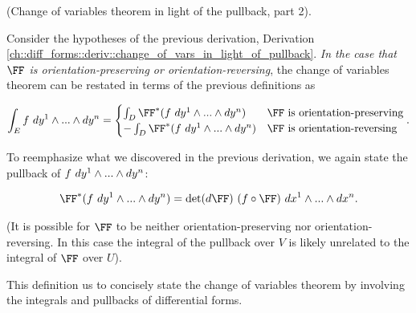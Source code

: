 \begin{theorem}
     (Change of variables theorem in light of the pullback, part 2).
    
    Consider the hypotheses of the previous derivation, Derivation \ref{ch::diff_forms::deriv::change_of_vars_in_light_of_pullback}. \textit{In the case that $\FF$ is orientation-preserving or orientation-reversing}, the change of variables theorem can be restated in terms of the previous definitions as
    
    \begin{align*}
        \int_E f \spc dy^1 \wedge ... \wedge dy^n
        =
        \begin{cases}
            \int_D \FF^*(f \spc dy^1 \wedge ... \wedge dy^n) & \text{$\FF$ is orientation-preserving} \\
            -\int_D \FF^*(f \spc dy^1 \wedge ... \wedge dy^n) & \text{$\FF$ is orientation-reversing}
        \end{cases}.
    \end{align*}
    
    To reemphasize what we discovered in the previous derivation, we again state the pullback of $f \text{ } dy^1 \wedge ... \wedge dy^n$:
    
    \begin{align*}
        \FF^*(f \spc dy^1 \wedge ... \wedge dy^n) = \det(d\FF) \spc (f \circ \FF) \spc dx^1 \wedge ... \wedge dx^n.
    \end{align*}
    
    (It is possible for $\FF$ to be neither orientation-preserving nor orientation-reversing. In this case the integral of the pullback over $V$ is likely unrelated to the integral of $\FF$ over $U$).
\end{theorem}

This definition us to concisely state the change of variables theorem by involving the integrals and pullbacks of differential forms.

